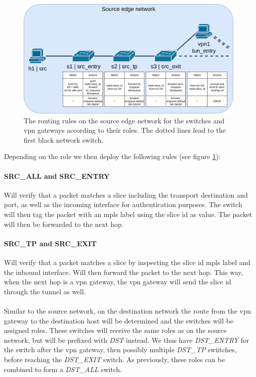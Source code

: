 \begin{figure}[ht]
  \centering
  \includegraphics[width=\linewidth]{images/chapter_6/routing_source.png}
  \caption[Routing on the source edge network]{The routing rules on the source edge network for the switches and \acrshort{vpn} gateways according to their roles. The dotted lines lead to the first black network switch.}
  \label{fig:routing_source}
\end{figure}

Depending on the role we then deploy the following rules (see figure \ref{fig:routing_source}):

\paragraph{SRC\_ALL and SRC\_ENTRY} Will verify that a packet matches a slice including the transport destination and port, as well as the incoming interface for authentication purposes. The switch will then tag the packet with an \acrshort{mpls} label using the slice id as value. The packet will then be forwarded to the next hop.

\paragraph{SRC\_TP and SRC\_EXIT} Will verify that a packet matches a slice by inspecting the slice id \acrshort{mpls} label and the inbound interface. Will then forward the packet to the next hop. This way, when the next hop is a \acrshort{vpn} gateway, the \acrshort{vpn} gateway will send the slice id through the tunnel as well.

\paragraph{} Similar to the source network, on the destination network the route from the \acrshort{vpn} gateway to the destination host will be determined and the switches will be assigned roles. These switches will receive the same roles as on the source network, but will be prefixed with \textit{DST} instead. We thus have \textit{DST\_ENTRY} for the switch after the \acrshort{vpn} gateway, then possibly multiple \textit{DST\_TP} swiitches, before reaching the \textit{DST\_EXIT} switch. As previously, these roles can be combined to form a \textit{DST\_ALL} switch.


